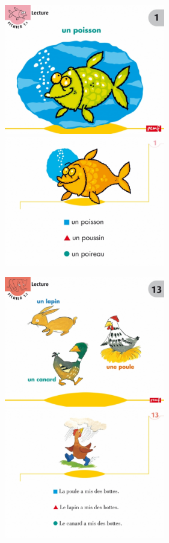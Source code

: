 \begin{center}
\begin{figure}[h]
   \begin{minipage}[c]{.46\linewidth}
      \includegraphics[width=7cm]{img/GSCP_f1recto.jpg}
   \end{minipage}  
   \begin{minipage}[c]{.46\linewidth}
      \includegraphics[width=7cm]{img/GSCP_f1verso.jpg}
   \end{minipage}
\end{figure}
\vline
\vline
\begin{figure}[h]
   \begin{minipage}[c]{.46\linewidth}
      \includegraphics[width=7cm]{img/CP_niv2_f13recto.jpg}
   \end{minipage}  
   \begin{minipage}[c]{.46\linewidth}
      \includegraphics[width=7cm]{img/CP_niv2_f13verso.jpg}

\end{minipage}
\end{figure}
\end{center}
